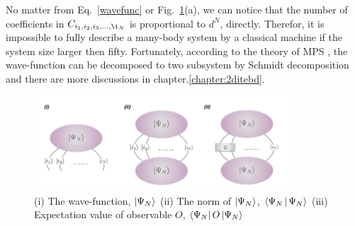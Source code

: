 No matter from Eq.~\ref{wavefunc} or Fig.~\ref{fig225}(a), we can notice that the number of coefficients in $C_{i_1,i_2,i_3,\ldots,\i_N}$ is proportional to $d^N$, directly. Therefor, it is impossible to fully describe a many-body system by a classical machine if the system size larger then fifty. Fortunately, according to the theory of MPS \cite{PhysRevB.73.094423} \cite{PhysRevLett.75.3537}, the wave-function can be decomposed to two subsystem by Schmidt decomposition and there are more discussions in chapter.\ref{chapter:2ditebd}. 
\begin{figure}[ht]
	\centering
	\includegraphics[width=0.85\textwidth]{figures/fig225.png}
	\caption[Represent wave-function of quntum states of TN]{(i) The wave-function, $\Ket{\Psi_N}$ (ii) The norm of $\Ket{\Psi_N}$, $\Braket{\Psi_N|\Psi_N}$ (iii) Expectation value of observable $O$, $\Bra{\Psi_N}O\Ket{\Psi_N}$}
	\label{fig225}
\end{figure}
